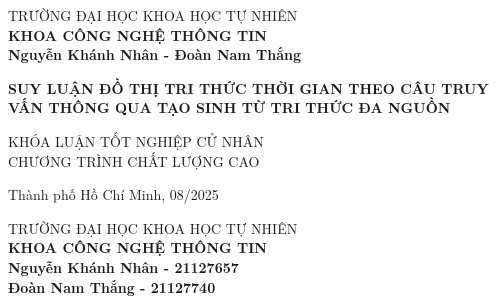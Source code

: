 \begin{titlepage}

\begin{center}
TRƯỜNG ĐẠI HỌC KHOA HỌC TỰ NHIÊN\\
\textbf{KHOA CÔNG NGHỆ THÔNG TIN}\\[2cm]


{ \Large \bfseries Nguyễn Khánh Nhân - Đoàn Nam Thắng\\[2cm] } 


{ \Large \bfseries SUY LUẬN ĐỒ THỊ TRI THỨC THỜI
GIAN THEO CÂU TRUY VẤN THÔNG QUA TẠO SINH TỪ TRI THỨC ĐA
NGUỒN \\[3cm]} 


\normalsize KHÓA LUẬN TỐT NGHIỆP CỬ NHÂN\\
\normalsize CHƯƠNG TRÌNH CHẤT LƯỢNG CAO\\



\vfill
Thành phố Hồ Chí Minh, 08/2025

\end{center}

\pagebreak



\begin{center}

TRƯỜNG ĐẠI HỌC KHOA HỌC TỰ NHIÊN\\
\textbf{KHOA CÔNG NGHỆ THÔNG TIN}\\[2cm]


{\large \bfseries Nguyễn Khánh Nhân - 21127657\\} 
{\large \bfseries Đoàn Nam Thắng - 21127740\\[2cm]}


\end{center}
\end{titlepage}
